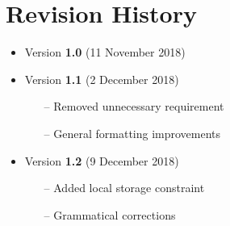\section{Revision History}
\begin{itemize}

    \item Version \textbf{1.0} (11 November 2018)
    
    \item Version \textbf{1.1} (2 December 2018)
    \begin{itemize}
    	\item[--] Removed unnecessary requirement
	\item[--] General formatting improvements
    \end{itemize}
	
    \item Version \textbf{1.2} (9 December 2018)
    \begin{itemize}
    	\item[--] Added local storage constraint
	\item[--] Grammatical corrections
    \end{itemize}
\end{itemize}